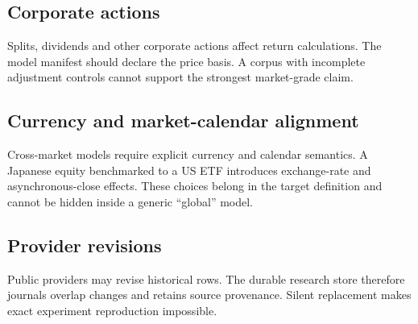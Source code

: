 \documentclass[11pt]{article}
\begin{document}
\subsection{Corporate actions}
Splits, dividends and other corporate actions affect return calculations. The model manifest should declare the price basis. A corpus with incomplete adjustment controls cannot support the strongest market-grade claim.

\subsection{Currency and market-calendar alignment}
Cross-market models require explicit currency and calendar semantics. A Japanese equity benchmarked to a US ETF introduces exchange-rate and asynchronous-close effects. These choices belong in the target definition and cannot be hidden inside a generic ``global'' model.

\subsection{Provider revisions}
Public providers may revise historical rows. The durable research store therefore journals overlap changes and retains source provenance. Silent replacement makes exact experiment reproduction impossible.
\end{document}
